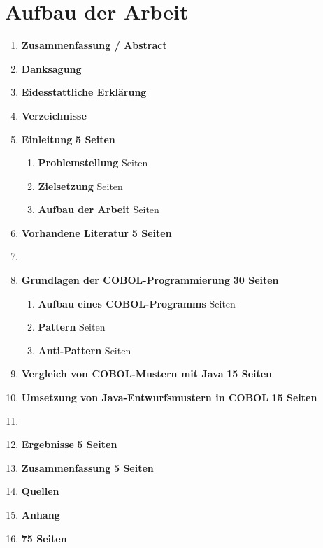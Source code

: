 \section{Aufbau der Arbeit}

\begin{framed}
\begin{enumerate}[label=\arabic*.]
	\item[] \textbf{Zusammenfassung / Abstract}
    \item[] \textbf{Danksagung}
    \item[] \textbf{Eidesstattliche Erklärung}
    \item[] \textbf{Verzeichnisse}
	\item   \textbf{Einleitung} \dotfill \textbf{5 Seiten}
    	\begin{enumerate}[label=\arabic*.]
    		\item \textbf{Problemstellung}  Seiten
        	\item \textbf{Zielsetzung}  Seiten
            \item \textbf{Aufbau der Arbeit}  Seiten
    	\end{enumerate}
    \item   \textbf{Vorhandene Literatur} \dotfill \textbf{5 Seiten}
    
    \item[] \dotfill
    
    \item   \textbf{Grundlagen der COBOL-Programmierung} \dotfill \textbf{30 Seiten}
    	\begin{enumerate}[label=\arabic*.]
          \item \textbf{Aufbau eines COBOL-Programms}  Seiten
          \item \textbf{Pattern}  Seiten
          \item \textbf{Anti-Pattern}  Seiten
    	\end{enumerate}
    \item   \textbf{Vergleich von COBOL-Mustern mit Java} \dotfill \textbf{15 Seiten}
    \item   \textbf{Umsetzung von Java-Entwurfsmustern in COBOL} \dotfill \textbf{15 Seiten}
    
    \item[] \dotfill
    
    \item   \textbf{Ergebnisse} \dotfill \textbf{5 Seiten}
    \item   \textbf{Zusammenfassung} \dotfill \textbf{5 Seiten}
    \item[] \textbf{Quellen}
    \item[] \textbf{Anhang}
    \item[] \hfill \textbf{75 Seiten}
\end{enumerate}
\end{framed}